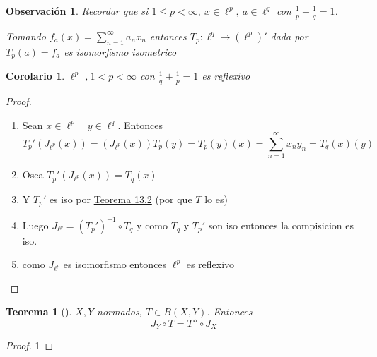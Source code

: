 \documentclass[10pt]{extarticle}
\theoremstyle{break}
\newtheorem{theorem}{Teorema}[section]
\newtheorem{corollary}{Corolario}[theorem]
\newtheorem*{remark}{Observación}
\theoremstyle{definition}
\begin{document}
\begin{remark}
	Recordar que si $1\leq p<\infty, \ x\in \ell^p, \ a\in \ell^{q} $ con $\frac{1}{p}+\frac{1}{q}=1$. 

	Tomando $f_{a}(x)=\sum_{n=1}^{\infty} a_{n} x_{n} $ entonces $T_{p}:\ell^{q} \longrightarrow (\ell^{p} )' $ dada por $T_{p}(a)=f_{a}$  es isomorfismo isometrico

\end{remark}

\begin{corollary}
	$\ell^{p} $ ,$\ 1<p<\infty$ con $\frac{1}{q}+\frac{1}{p}=1$ es reflexivo 
\end{corollary}

\begin{proof}
	
	\begin{enumerate}	
		\item Sean $x\in\ell^{p} \quad y\in \ell^{q}$. Entonces 
			$$T_{p}'(J_{\ell^{p}}(x))=(J_{\ell^{p} }(x))T_{p}(y)=T_{p}(y)(x)=\sum_{n=1}^{\infty} x_{n} y_{n} =T_{q}(x)(y)$$ 

		\item Osea $T_{p}'(J_{\ell^{p} }(x))=T_{q}(x)	$
		\item Y $T_{p}'$ es iso por \hyperref[13.2]{Teorema 13.2} (por que $T$ lo es)  
		\item Luego $J_{\ell^{p} }=( T_{p}' )^{-1} \circ T_{q}$ y como $T_{q}$ y $T_{p}'$ son iso entonces la compisicion es iso. 
		\item como $J_{\ell^{p} }$ es isomorfismo entonces $\ell^{p} $ es reflexivo 
	\end{enumerate}
\end{proof}

\begin{theorem}[]
	$X,Y$ normados, $T\in B(X,Y)$. Entonces 
	\begin{equation}J_{Y}\circ T=T'' \circ J_{X}\label{1}\tag{1}\end{equation}
\end{theorem}
\begin{proof}
	1
\end{proof}
\end{document}
